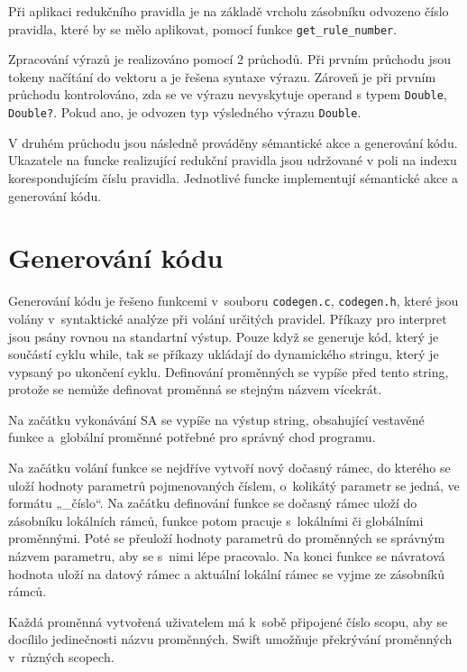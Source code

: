 \documentclass[11spt]{article}
\begin{document}
Při aplikaci redukčního pravidla je na základě vrcholu zásobníku odvozeno číslo pravidla, které by se mělo aplikovat, pomocí funkce \texttt{get\_rule\_number}.


Zpracování výrazů je realizováno pomocí 2 průchodů. Při prvním průchodu jsou tokeny načítání do vektoru a je řešena syntaxe výrazu.
Zároveň je při prvním průchodu kontrolováno, zda se ve výrazu nevyskytuje operand s typem \texttt{Double}, \texttt{Double?}. Pokud
ano, je odvozen typ výsledného výrazu \texttt{Double}.

V druhém průchodu jsou následně prováděny sémantické akce a generování kódu.
Ukazatele na funcke realizující redukční pravidla jsou udržované v poli na indexu korespondujícím
číslu pravidla. Jednotlivé funcke implementují sémantické akce a generování kódu.












\section{Generování kódu}
Generování kódu je řešeno funkcemi v~souboru \texttt{codegen.c},  \texttt{codegen.h},
které jsou volány v~syntaktické analýze při volání určitých pravidel.
Příkazy pro interpret jsou psány rovnou na standartní výstup.
Pouze když se generuje kód, který je součástí cyklu while, tak se příkazy ukládají
do dynamického stringu, který je vypsaný po ukončení cyklu.
Definování proměnných se vypíše před tento string, protože se nemůže definovat proměnná se stejným názvem vícekrát.

Na začátku vykonávání SA se vypíše na výstup string, obsahující vestavěné funkce a~globální proměnné potřebné pro správný chod programu.

Na začátku volání funkce se nejdříve vytvoří nový dočasný rámec, do kterého se uloží hodnoty parametrů pojmenovaných číslem,
o~kolikátý parametr se jedná, ve formátu „\_číslo“. Na začátku definování funkce se dočasný rámec uloží do zásobníku
lokálních rámců, funkce potom pracuje s~lokálními či globálními proměnnými.
Poté se přeuloží hodnoty parametrů do proměnných se správným názvem parametru, aby se s~nimi lépe pracovalo.
Na konci funkce se návratová hodnota uloží na datový rámec a aktuální lokální rámec se vyjme ze zásobníků rámců.

Každá proměnná vytvořená uživatelem má k~sobě připojené číslo scopu, aby se docílilo jedinečnosti názvu proměnných.
Swift umožňuje překrývání proměnných v~různých scopech.
\end{document}
